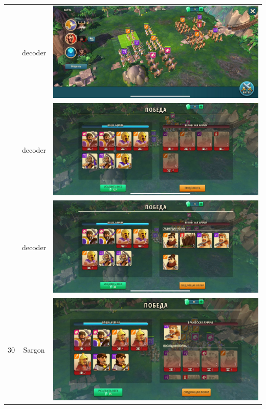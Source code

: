 \begin{longtable}{|c|c|c|}
    & decoder &
    \includegraphics[width=0.75\linewidth]{./parts/media/TreasureHunt/30/decoder/photo_2022-04-07_10-00-22.jpg} \\
    & decoder &
    \includegraphics[width=0.75\linewidth]{./parts/media/TreasureHunt/30/decoder/photo_2022-04-07_10-00-32.jpg} \\
    & decoder &
    \includegraphics[width=0.75\linewidth]{./parts/media/TreasureHunt/30/decoder/photo_2022-04-07_09-59-40.jpg} \\
    \hline
    \multirow{10}{*}{30} & Sargon &
    \includegraphics[width=0.75\linewidth]{./parts/media/TreasureHunt/30/sargon/photo_2022-04-07_10-05-00.jpg} \\

\end{longtable}
